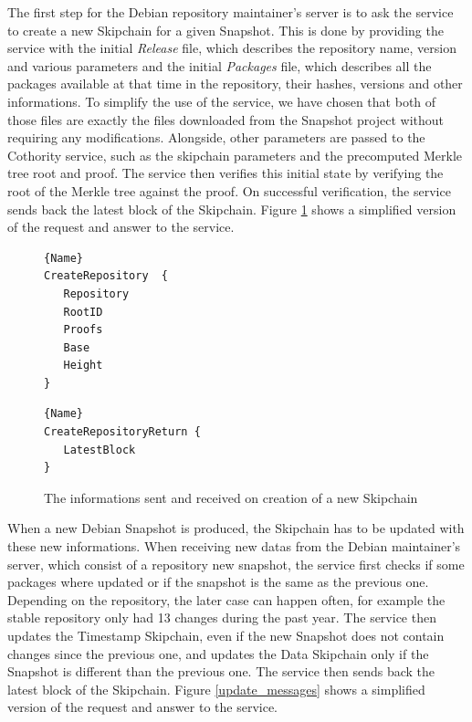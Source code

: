 \documentclass[11pt, upma4paper, twoside, openany, parskip=half]{book}
\begin{document}
The first step for the Debian repository maintainer's server is to ask the service to create a new Skipchain for a given Snapshot. This is done by providing the service with the initial \emph{Release} file, which describes the repository name, version and various parameters and the initial \emph{Packages} file, which describes all the packages available at that time in the repository, their hashes, versions and other informations. To simplify the use of the service, we have chosen that both of those files are exactly the files downloaded from the Snapshot project without requiring any modifications. Alongside, other parameters are passed to the Cothority service, such as the skipchain parameters and the precomputed Merkle tree root and proof. The service then verifies this initial state by verifying the root of the Merkle tree against the proof. On successful verification, the service sends back the latest block of the Skipchain. Figure \ref{creation_messages} shows a simplified version of the request and answer to the service.


\begin{figure}[H]
\noindent\begin{minipage}[t]{.45\textwidth}
\begin{lstlisting}[frame=tlrb,basicstyle=\ttfamily]{Name}
CreateRepository  {
   Repository  
   RootID
   Proofs
   Base 
   Height 
}
\end{lstlisting}
\end{minipage}\hfill
\begin{minipage}[t]{.45\textwidth}
\begin{lstlisting}[frame=tlrb,basicstyle=\ttfamily]{Name}
CreateRepositoryReturn {
   LatestBlock
}
\end{lstlisting}
\end{minipage}
\caption{The informations sent and received on creation of a new Skipchain}
\label{creation_messages}
\end{figure}

When a new Debian Snapshot is produced, the Skipchain has to be updated with these new informations. When receiving new datas from the Debian maintainer's server, which consist of a repository new snapshot, the service first checks if some packages where updated or if the snapshot is the same as the previous one. Depending on the repository, the later case can happen often, for example the stable repository only had 13 changes during the past year. The service then updates the Timestamp Skipchain, even if the new Snapshot does not contain changes since the previous one, and updates the Data Skipchain only if the Snapshot is different than the previous one. The service then sends back the latest block of the Skipchain. Figure \ref{update_messages} shows a simplified version of the request and answer to the service.
\end{document}
